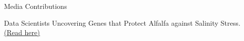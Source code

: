 \begin{rubric}{Media Contributions}

\entrys[2021] Data Scientists Uncovering Genes that Protect Alfalfa against Salinity Stress.  \href{https://www.usu.edu/today/story/data-scientists-uncovering-genes-that-protect-alfalfa-against-salinity-stress/}{(Read here)}

\end{rubric}